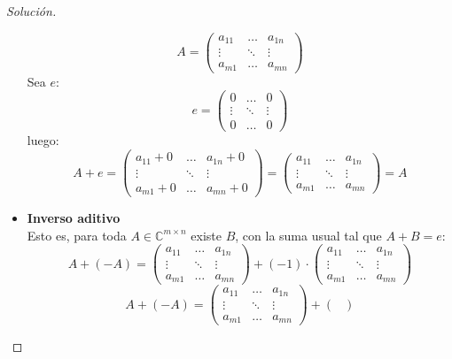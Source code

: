 \documentclass[12pt]{book}
\newcommand{\C}{\mathbb{C}}
\newenvironment{solucion}
  {\renewcommand\qedsymbol{$\square$}\begin{proof}[Solución]}
  {\end{proof}}
\begin{document}
\begin{solucion}
\begin{itemize}
        \[
        A=\begin{pmatrix}
        a_{11} & \dots & a_{1n}\\
        \vdots & \ddots & \vdots\\
        a_{m1} & \dots & a_{mn}
        \end{pmatrix}
        \]
        Sea $e$:
        \[
        e=\begin{pmatrix}
        0 & \dots & 0\\
        \vdots & \ddots & \vdots\\
        0 & \dots & 0
        \end{pmatrix}
        \]
        luego:
        \[
        A + e =\begin{pmatrix}
        a_{11}+0  & \dots & a_{1n}+0\\
        \vdots & \ddots & \vdots\\
        a_{m1}+0 & \dots & a_{mn}+0
        \end{pmatrix}=\begin{pmatrix}
        a_{11}  & \dots & a_{1n}\\
        \vdots & \ddots & \vdots\\
        a_{m1} & \dots & a_{mn}
        \end{pmatrix}=A
        \]
    \item \textbf{Inverso aditivo}\\
        Esto es, para toda $ A \in \C^{m\times n}$ existe $B$, con la suma usual tal que $A+B=e$:\\
        \[A + (-A) = \begin{pmatrix}
        a_{11} & \dots & a_{1n}\\
        \vdots & \ddots & \vdots\\
        a_{m1} & \dots & a_{mn}
        \end{pmatrix}
        + 
        (-1)\cdot\begin{pmatrix}
        a_{11} & \dots & a_{1n}\\
        \vdots & \ddots & \vdots\\
        a_{m1} & \dots & a_{mn}
        \end{pmatrix}\]
        \[A + (-A) =
        \begin{pmatrix}
        a_{11} & \dots & a_{1n}\\
        \vdots & \ddots & \vdots\\
        a_{m1} & \dots & a_{mn}
        \end{pmatrix}
        + 
        \begin{pmatrix}

\end{pmatrix}\]
\end{itemize}
\end{solucion}
\end{document}
